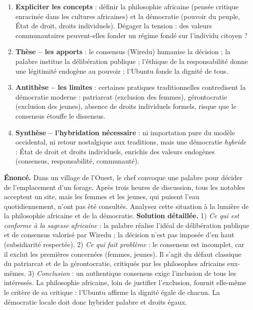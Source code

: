 \documentclass[11pt]{article}
\begin{document}
\begin{methode}
\begin{enumerate}
\item \textbf{Expliciter les concepts} : définir la philosophie africaine (pensée critique enracinée dans les cultures africaines) et la démocratie (pouvoir du peuple, État de droit, droits individuels). Dégager la tension : des valeurs communautaires peuvent-elles fonder un régime fondé sur l'individu citoyen ?
\item \textbf{Thèse -- les apports} : le consensus (Wiredu) humanise la décision ; la palabre institue la délibération publique ; l'éthique de la responsabilité donne une légitimité endogène au pouvoir ; l'Ubuntu fonde la dignité de tous.
\item \textbf{Antithèse -- les limites} : certaines pratiques traditionnelles contredisent la démocratie moderne : patriarcat (exclusion des femmes), gérontocratie (exclusion des jeunes), absence de droits individuels formels, risque que le consensus étouffe le dissensus.
\item \textbf{Synthèse -- l'hybridation nécessaire} : ni importation pure du modèle occidental, ni retour nostalgique aux traditions, mais une démocratie \emph{hybride} : État de droit et droits individuels, enrichis des valeurs endogènes (consensus, responsabilité, communauté).
\end{enumerate}
\end{methode}

\begin{exoresolu}
\textbf{Énoncé.} Dans un village de l'Ouest, le chef convoque une palabre pour décider de l'emplacement d'un forage. Après trois heures de discussion, tous les notables acceptent un site, mais les femmes et les jeunes, qui puisent l'eau quotidiennement, n'ont pas été consultés. Analysez cette situation à la lumière de la philosophie africaine et de la démocratie.
\tcblower
\textbf{Solution détaillée.} 1) \emph{Ce qui est conforme à la sagesse africaine} : la palabre réalise l'idéal de délibération publique et de consensus valorisé par Wiredu ; la décision n'est pas imposée d'en haut (subsidiarité respectée). 2) \emph{Ce qui fait problème} : le consensus est incomplet, car il exclut les premières concernées (femmes, jeunes). Il s'agit du défaut classique du patriarcat et de la gérontocratie, critiqués par les philosophes africains eux-mêmes. 3) \emph{Conclusion} : un authentique consensus exige l'inclusion de tous les intéressés. La philosophie africaine, loin de justifier l'exclusion, fournit elle-même le critère de sa critique : l'Ubuntu affirme la dignité égale de chacun. La démocratie locale doit donc hybrider palabre et droits égaux.
\end{exoresolu}
\end{document}
